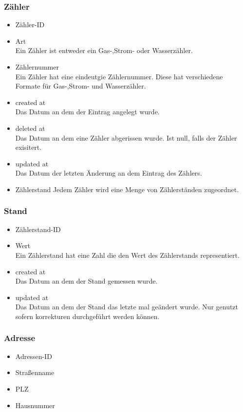 \subsubsection*{Zähler}
	\begin{itemize}
	    \item Zähler-ID
		\item Art\hfill \\
		Ein Zähler ist entweder ein Gas-,Strom- oder Wasserzähler.
		\item Zählernummer\hfill \\
		Ein Zähler hat eine eindeutgie Zählernummer. Diese hat verschiedene Formate für Gas-,Strom- und Wasserzähler.
		\item created at\hfill \\
		Das Datum an dem der Eintrag angelegt wurde.
		\item deleted at\hfill \\
		Das Datum an dem eine Zähler abgerissen wurde. Ist null, falls der Zähler exisitert.
		\item updated at\hfill \\
		Das Datum der letzten Änderung an dem Eintrag des Zählers.
		\item Zählerstand
		Jedem Zähler wird eine Menge von Zählerständen zugeordnet.
	\end{itemize}
\subsubsection*{Stand}
	\begin{itemize}
	    \item Zählerstand-ID
		\item Wert\hfill \\
		Ein Zählerstand hat eine Zahl die den Wert des Zählerstands representiert.
		\item created at\hfill \\
		Das Datum an dem der Stand gemessen wurde.
		\item updated at\hfill \\
		Das Datum an dem der Stand das letzte mal geändert wurde. Nur genutzt sofern korrekturen durchgeführt werden können.
	\end{itemize}
\subsubsection*{Adresse}
	\begin{itemize}
	    \item Adressen-ID
		\item Straßenname
		\item PLZ
		\item Hausnummer
	\end{itemize}
